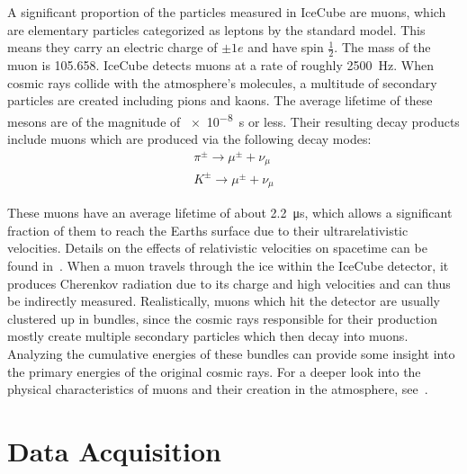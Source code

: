 A significant proportion of the particles measured in IceCube are muons, which are elementary particles categorized as leptons by the standard model.
This means they carry an electric charge of $\pm 1e$ and have spin $\frac{1}{2}$. The mass of the muon is \num{105.658}. IceCube detects
muons at a rate of roughly \SI{2500}{Hz}. When cosmic rays collide with the atmosphere's molecules, a multitude of secondary particles are created including 
pions and kaons. The average lifetime of these mesons are of the magnitude of \SI{e-8}{s} or less. Their resulting decay products include muons which are 
produced via the following decay modes:\\

\begin{align}
    \pi^\pm \to \mu^\pm + \nu_\mu \\
    K^\pm \to \mu^\pm + \nu_\mu
\end{align}

These muons have an average lifetime of about \SI{2.2}{\micro\second}, which allows a significant fraction of them to reach the Earths surface due to their 
ultrarelativistic velocities. Details on the effects of relativistic velocities on spacetime can be found in~\cite{deBarros2016}. When a muon travels through the ice 
within the IceCube detector, it produces Cherenkov radiation due to its charge and high velocities and 
can thus be indirectly measured. Realistically, muons which hit the detector are usually clustered up in bundles, since the cosmic rays responsible for their production
mostly create multiple secondary particles which then decay into muons. Analyzing the cumulative energies of these bundles can provide some insight into the primary 
energies of the original cosmic rays. For a deeper look into the physical characteristics of muons and their creation in the atmosphere, see~\cite{Cecchini2012}.


\section{Data Acquisition}\label{sec:daq}

